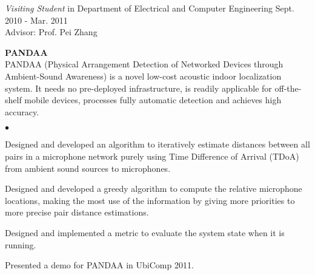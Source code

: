 \documentclass[margin,line]{res}
\newenvironment{list1}{
  \begin{list}{\ding{113}}{
      \setlength{\itemsep}{0in}
      \setlength{\parsep}{0in} \setlength{\parskip}{0in}
      \setlength{\topsep}{0in} \setlength{\partopsep}{0in}
      \setlength{\leftmargin}{0.17in}}}{\end{list}}
\newenvironment{list2}{
  \begin{list}{$\bullet$}{
      \setlength{\itemsep}{0in}
      \setlength{\parsep}{0in} \setlength{\parskip}{0in}
      \setlength{\topsep}{0in} \setlength{\partopsep}{0in}
      \setlength{\leftmargin}{0.2in}}}{\end{list}}
\begin{document}
\begin{resume}
      \vspace{-.3cm}
      {\em Visiting Student} in Department of Electrical and Computer Engineering \hfill Sept. 2010 - Mar. 2011\\
      Advisor: Prof. Pei Zhang\\
      \vspace*{-.1in}
      \begin{list1}
        \item[] {\bf PANDAA}\\
        PANDAA (Physical Arrangement Detection of Networked Devices through Ambient-Sound Awareness) is a novel low-cost acoustic indoor localization system. It needs no pre-deployed infrastructure, is readily applicable for off-the-shelf mobile devices, processes fully automatic detection and achieves high accuracy.
        \vspace*{.05in}
        \begin{list2}
          \item Designed and developed an algorithm to iteratively estimate distances between all pairs in a microphone network purely using Time Difference of Arrival (TDoA) from ambient sound sources to microphones.
          \item Designed and developed a greedy algorithm to compute the relative microphone locations, making the most use of the information by giving more priorities to more precise pair distance estimations.
          \item Designed and implemented a metric to evaluate the system state when it is running.
          \item Presented a demo for PANDAA in UbiComp 2011.
        \end{list2}



\end{list1}
\end{resume}
\end{document}
